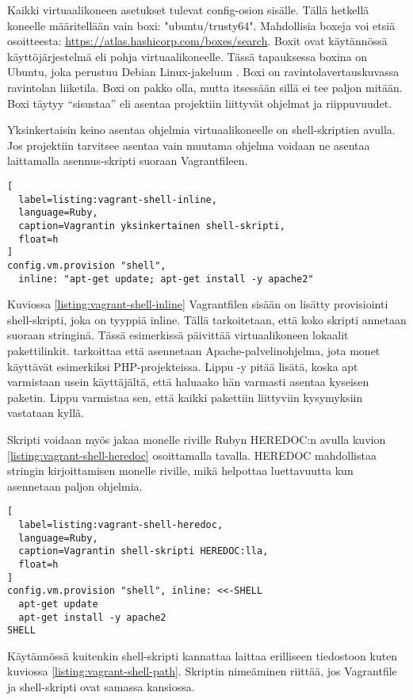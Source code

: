 Kaikki virtuaalikoneen asetukset tulevat config-osion sisälle. Tällä hetkellä koneelle määritellään vain boxi: "ubuntu/trusty64". Mahdollisia boxeja voi etsiä osoitteesta: \url{https://atlas.hashicorp.com/boxes/search}. Boxit ovat käytännössä käyttöjärjestelmä eli pohja virtuaalikoneelle. Tässä tapauksessa boxina on Ubuntu, joka perustuu Debian Linux-jakeluun \cite{link:ubuntu}. Boxi on ravintolavertauskuvassa ravintolan liiketila. Boxi on pakko olla, mutta itsessään sillä ei tee paljon mitään. Boxi täytyy \enquote{sisustaa} eli asentaa projektiin liittyvät ohjelmat ja riippuvuudet.

Yksinkertaisin keino asentaa ohjelmia virtuaalikoneelle on shell-skriptien avulla. Jos projektiin tarvitsee asentaa vain muutama ohjelma voidaan ne asentaa laittamalla asennus-skripti suoraan Vagrantfileen. 

\begin{lstlisting}[
  label=listing:vagrant-shell-inline,
  language=Ruby,
  caption=Vagrantin yksinkertainen shell-skripti,
  float=h
]
config.vm.provision "shell",
  inline: "apt-get update; apt-get install -y apache2"
\end{lstlisting}

Kuviossa \ref{listing:vagrant-shell-inline} Vagrantfilen sisään on lisätty provisiointi shell-skripti, joka on tyyppiä inline. Tällä tarkoitetaan, että koko skripti annetaan suoraan stringinä. Tässä esimerkissä  päivittää virtuaalikoneen lokaalit pakettilinkit.  tarkoittaa että asennetaan Apache-palvelinohjelma, jota monet käyttävät esimerkiksi PHP-projekteissa. Lippu -y pitää lisätä, koska apt varmistaan usein käyttäjältä, että haluaako hän varmasti asentaa kyseisen paketin. Lippu varmistaa sen, että kaikki pakettiin liittyviin kysymyksiin vastataan kyllä.

Skripti voidaan myös jakaa monelle riville Rubyn HEREDOC:n avulla kuvion \ref{listing:vagrant-shell-heredoc} osoittamalla tavalla. HEREDOC \cite{link:ruby-heredoc} mahdollistaa stringin kirjoittamisen monelle riville, mikä helpottaa luettavuutta kun asennetaan paljon ohjelmia.

\begin{lstlisting}[
  label=listing:vagrant-shell-heredoc,
  language=Ruby,
  caption=Vagrantin shell-skripti HEREDOC:lla,
  float=h
]
config.vm.provision "shell", inline: <<-SHELL
  apt-get update
  apt-get install -y apache2
SHELL
\end{lstlisting}

Käytännössä kuitenkin shell-skripti kannattaa laittaa erilliseen tiedostoon kuten kuviossa \ref{listing:vagrant-shell-path}. Skriptin nimeäminen riittää, jos Vagrantfile ja shell-skripti ovat samassa kansiossa.

